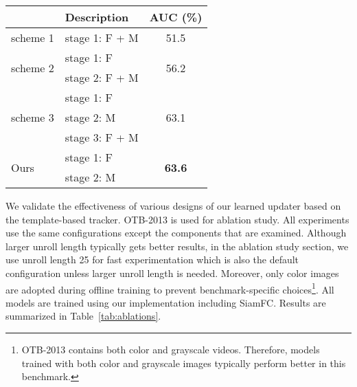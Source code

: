 \documentclass[journal]{IEEEtran}
\begin{document}
\begin{table*}[]
{			\begin{tabular}{l|l|c}
			\hline
			& Description & AUC (\%) \\
			\hline
			scheme 1 & stage 1: F + M & 51.5 \\
			\hline
			\multirow{2}{*}{scheme 2} & stage 1: F & \multirow{2}{*}{56.2}  \\
									   & stage 2: F + M & \\
			\hline
			\multirow{3}{*}{scheme 3} & stage 1: F & \multirow{3}{*}{63.1} \\
					 & stage 2: M & \\
					 & stage 3: F + M & \\
			\hline
			\multirow{2}{*}{Ours} & stage 1: F & \multirow{2}{*}{\textbf{63.6}} \\
				 & stage 2: M & \\
			\hline
			\end{tabular}
		}

		\hspace{3mm}
		\hspace{3mm}
		\hspace{3mm}
\end{table*}

We validate the effectiveness of various designs of our learned updater based on the template-based tracker. OTB-2013 is used for ablation study. All experiments use the same configurations except the components that are examined. Although larger unroll length typically gets better results, in the ablation study section, we use unroll length 25 for fast experimentation which is also the default configuration unless larger unroll length is needed. Moreover, only color images are adopted during offline training to prevent benchmark-specific choices\footnote{OTB-2013 contains both color and grayscale videos. Therefore, models trained with both color and grayscale images typically perform better in this benchmark.}. All models are trained using our implementation including SiamFC. Results are summarized in Table~\ref{tab:ablations}.
\end{document}
